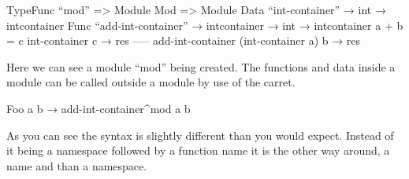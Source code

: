 \begin{code}
	TypeFunc “mod” => Module
	Mod => Module {
		Data “int-container” → int → intcontainer
		Func “add-int-container” → intcontainer → int → intcontainer
		a + b = c
		int-container c → res
		-----
		add-int-container (int-container a) b → res
	}
\end{code}

Here we can see a module “mod” being created. The functions and data inside a module can be called outside a module by use of the carret.

\begin{code}
	Foo a b → add-int-container^mod a b
\end{code}

As you can see the syntax is slightly different than you would expect. Instead of it being a namespace followed by a function name it is the other way around, a name and than a namespace.


